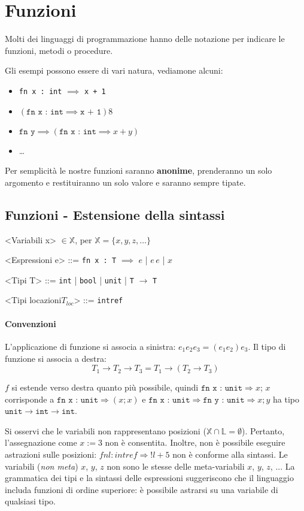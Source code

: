 \chapter{Funzioni}
Molti dei linguaggi di programmazione hanno delle 
notazione per indicare le funzioni, metodi o procedure.

Gli esempi possono essere di vari natura, vediamone alcuni:
\begin{itemize}
\item \texttt{fn x : int} $\implies$ \texttt{x + 1}
\item $(\texttt{fn x : int} \implies \texttt{x + 1})8$
\item $\texttt{fn y} \implies (\texttt{fn x : int} \implies x + y)$
\item \dots
\end{itemize}
Per semplicità le nostre funzioni saranno \textbf{anonime}, prenderanno 
un solo argomento e restituiranno un solo valore e saranno sempre tipate.
\section{Funzioni - Estensione della sintassi}

\begin{grammar}
<Variabili x> $\in \mathbb{X}$, per $\mathbb{X} = \{x, y, z, \dots\}$

<Espressioni e> ::= \texttt{fn x : T} $\implies$ $e$ | $e\,e$ | $x$

<Tipi T> ::= \texttt{int} | \texttt{bool} | \texttt{unit} | \texttt{T} $\rightarrow$ \texttt{T}

<Tipi locazioni$T_{loc}$> ::= \texttt{intref}
\end{grammar}
\subsubsection{Convenzioni}
L'applicazione di funzione si associa
a sinistra: $e_1e_2e_3=(e_1e_2)e_3$. Il tipo di funzione si associa
a destra: 
\[T_1\rightarrow T_2\rightarrow T_3=T_1\rightarrow(T_2\rightarrow T_3)\]

$f$ si estende verso destra quanto più possibile, quindi $\texttt{fn x : unit}
\Rightarrow x$; $x$ corrisponde a $\texttt{fn x : unit} \Rightarrow(x;x)$
e $\texttt{fn x : unit} \Rightarrow \texttt{fn y : unit}\Rightarrow x;y$
ha tipo $\texttt{unit}\rightarrow \texttt{int}\rightarrow \texttt{int}$.

Si osservi che le variabili non rappresentano posizioni ($\mathbb{X} \cap \mathbb{L} =
\emptyset$). Pertanto, l'assegnazione come $x := 3$ non è consentita. Inoltre, non
è possibile eseguire astrazioni sulle posizioni: $fnl:intref \Rightarrow !l + 5$ non
è conforme alla sintassi. Le variabili (\textit{non meta}) $x$, $y$, $z$ non sono
le stesse delle meta-variabili $x$, $y$, $z$, ... La grammatica dei tipi e la sintassi
delle espressioni suggeriscono che il linguaggio includa funzioni di ordine superiore:
è possibile astrarsi su una variabile di qualsiasi tipo.

